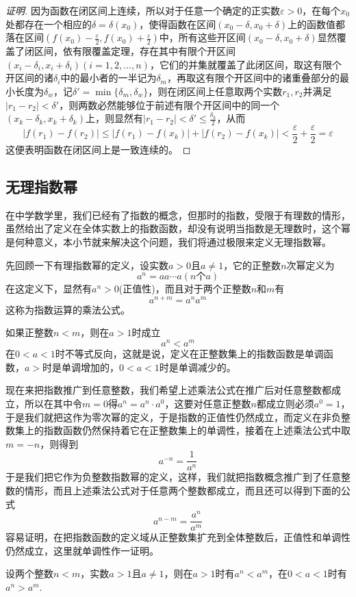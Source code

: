 \begin{proof}[证明]
  因为函数在闭区间上连续，所以对于任意一个确定的正实数$\varepsilon>0$，在每个$x_0$处都存在一个相应的$\delta=\delta(x_0)$，使得函数在区间$(x_0-\delta,x_0+\delta)$上的函数值都落在区间$(f(x_0)-\frac{\varepsilon}{2},f(x_0)+\frac{\varepsilon}{2})$中，所有这些开区间$(x_0-\delta,x_0+\delta)$显然覆盖了闭区间，依有限覆盖定理，存在其中有限个开区间$(x_i-\delta_i,x_i+\delta_i)(i=1,2,\ldots,n)$，它们的并集就覆盖了此闭区间，取这有限个开区间的诸$\delta_i$中的最小者的一半记为$\delta_m$，再取这有限个开区间中的诸重叠部分的最小长度为$\delta_w$，记$\delta'=\min\{\delta_m,\delta_w\}$，则在闭区间上任意取两个实数$r_1,r_2$并满足$|r_1-r_2|<\delta'$，则两数必然能够位于前述有限个开区间中的同一个$(x_k-\delta_k,x_k+\delta_k)$上，则显然有$|r_1-r_2|<\delta'\leqslant \frac{\delta_k}{2}$，从而
  \[ |f(r_1)-f(r_2)| \leqslant |f(r_1)-f(x_k)|+|f(r_2)-f(x_k)|< \frac{\varepsilon}{2}+\frac{\varepsilon}{2} = \varepsilon \]
  这便表明函数在闭区间上是一致连续的。
\end{proof}

\subsection{无理指数幂}
\label{sec:irrational-power}

在中学数学里，我们已经有了指数的概念，但那时的指数，受限于有理数的情形，虽然给出了定义在全体实数上的指数函数，却没有说明当指数是无理数时，这个幂是何种意义，本小节就来解决这个问题，我们将通过极限来定义无理指数幂。

先回顾一下有理指数幂的定义，设实数$a>0$且$a \neq 1$，它的正整数$n$次幂定义为
\[ a^n = aa\cdots a(n\text{个}a) \]
在这定义下，显然有$a^n>0$(正值性)，而且对于两个正整数$n$和$m$有
\begin{equation}
  \label{eq:exponent-multiple-rule-with-positive-integer}
  a^{n+m}=a^na^m
\end{equation}
这称为指数运算的乘法公式。

如果正整数$n<m$，则在$a>1$时成立
\[ a^n<a^m \]
在$0<a<1$时不等式反向，这就是说，定义在正整数集上的指数函数是单调函数，$a>$时是单调增加的，$0<a<1$时是单调减少的。

现在来把指数推广到任意整数，我们希望上述乘法公式在推广后对任意整数都成立，所以在其中令$m=0$得$a^n=a^n \cdot a^0$，这要对任意正整数$n$都成立则必须$a^0=1$，于是我们就把这作为零次幂的定义，于是指数的正值性仍然成立，而定义在非负整数集上的指数函数仍然保持着它在正整数集上的单调性，接着在上述乘法公式中取$m=-n$，则得到
\[ a^{-n} = \frac{1}{a^n} \]
于是我们把它作为负整数指数幂的定义，这样，我们就把指数概念推广到了任意整数的情形，而且上述乘法公式对于任意两个整数都成立，而且还可以得到下面的公式
\[ a^{n-m} = \frac{a^n}{a^m} \]
容易证明，在把指数函数的定义域从正整数集扩充到全体整数后，正值性和单调性仍然成立，这里就单调性作一证明。
\begin{theorem}
  设两个整数$n<m$，实数$a>1$且$a \neq 1$，则在$a>1$时有$a^n<a^m$，在$0<a<1$时有$a^n>a^m$.
\end{theorem}

